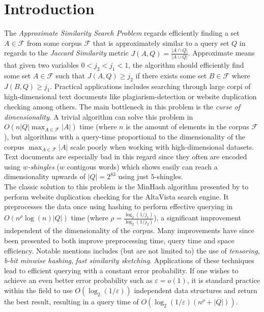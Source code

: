 \section{Introduction}
The \textit{Approximate Similarity Search Problem} regards efficiently finding a set $A\in \mathcal{F}$ from some corpus $\mathcal{F}$ that is approximately similar to a query set $Q$ in regards to the \textit{Jaccard Similarity} metric $J(A,Q) = \frac{|A\cap Q|}{|A\cup Q|}$\cite{dahlgaard2017fast}\cite{fast-similarity-search}. Approximate means that given two variables $0 < j_2 < j_1 < 1$, the algorithm should efficiently find some set $A\in \mathcal{F}$ such that $J(A, Q) \geq j_2$ if there exists some set $B\in \mathcal{F}$ where $J(B,Q)\geq j_1$.
Practical applications includes searching through large corpi of high-dimensional text documents like plagiarism-detection or website duplication checking among others\cite{vassilvitskii2018}. The main bottleneck in this problem is the \textit{curse of dimensionality}. 
A trivial algorithm can solve this problem in $O(n|Q|\max_{A\in \mathcal{F}}{|A|})$ time (where $n$ is the amount of elements in the corpus $\mathcal{F}$), but algorithms with a query-time proportional to the dimensionality of the corpus $\max_{A\in \mathcal{F}}|A|$ scale poorly when working with high-dimensional datasets. 
Text documents are especially bad in this regard since they often are encoded using \textit{$w$-shingles} ($w$ contigous words) which \citet{li2011hashing} shows easily can reach a dimensionality upwards of $|Q|=2^{83}$ using just $5$-shingles.\\
The classic solution to this problem is the MinHash algorithm presented by \citet{broder1997minhash} to perform website duplication checking for the AltaVista search engine. 
It preprocesses the data once using hashing to perform effective querying in $O(n^\rho\log(n)|Q|)$ time (where $\rho = \frac{\log_2{(1/j_1)}}{\log_2{(1/j_2)}}$), a significant improvement independent of the dimensionality of the corpus.
Many improvements have since been presented to both improve preprocessing time, query time and space efficiency. 
Notable mentions includes (but are not limited to) the use of \textit{tensoring}\cite{andoni2006efficient}, \textit{b-bit minwise hashing}\cite{ping2011theory}, \textit{fast similarity sketching}\cite{dahlgaard2017fast}. 
Applications of these techniques lead to efficient querying with a constant error probability. If one wishes to achieve an even better error probability such as $\varepsilon = o(1)$, it is standard practice within the field to use $O(\log_2(1/\varepsilon))$ independent data structures and return the best result, resulting in a query time of $O(\log_2(1/\varepsilon) (n^\rho + |Q|))$. 

